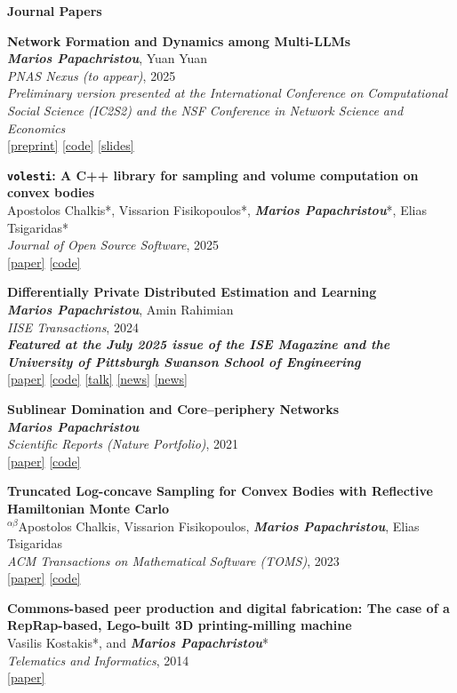 \documentclass[margin]{res}
\newcommand{\field}[2]{\noindent \textbf{#1} \hfill #2 \\}
\newcommand{\alphabeticalorder}[0]{\ensuremath {^{\alpha \beta}}}
\newcommand{\specialurl}[2]{\href {#2} {{{[#1]}}}}
\newcommand{\preprint}[1]{\specialurl {preprint} {#1}}
\newcommand{\code}[1]{\specialurl {code} {#1}}
\newcommand{\talk}[1]{\specialurl {talk} {#1}}
\newcommand{\slides}[1]{\specialurl {slides} {#1}}
\newcommand{\paper}[1]{\specialurl {paper} {#1}}
\newcommand{\authorref}[1]{{\textit{\textbf{#1}}}}
\newcommand{\news}[1]{\specialurl {news} {#1}}
\newcommand{\authorme}{\authorref{Marios Papachristou}}
\newcommand{\bemph}[1]{\textbf{\emph{#1}}}
\newcommand{\publication}[5]{\textbf{#1}\\{#2}\\\emph{#3}, {#4}\\{#5}\smallskip}
\begin{document}
\begin{resume}
\field{Journal Papers}{}{
\begin{enumerate}[nosep, label={[J\arabic*]}]
 		
   \item \publication{Network Formation and Dynamics among Multi-LLMs}{\authorme, Yuan Yuan}{PNAS Nexus (to appear)}{2025}{\emph{Preliminary version presented at the International Conference on Computational Social Science (IC2S2) and the NSF Conference in Network Science and Economics} \\ \preprint{http://arxiv.org/abs/2402.10659} \code{https://github.com/papachristoumarios/llm-network-formation} \slides{https://drive.google.com/file/d/13Qm_82D0WrkmN1LAv2AUmjcputMOdm_y/view?usp=drive_link}} 
      
 
	\item \publication{\texttt{volesti}: A C++ library for sampling and volume computation on convex bodies}{Apostolos Chalkis*, Vissarion Fisikopoulos*, \authorme*, Elias Tsigaridas*}{Journal of Open Source Software}{2025}{\paper{https://joss.theoj.org/papers/10.21105/joss.07886} \code{https://github.com/GeomScale/volesti}}
   \item \publication{Differentially Private Distributed Estimation and Learning}{\authorme, Amin Rahimian}{IISE Transactions}{2024}{\bemph{Featured at the July 2025 issue of the ISE Magazine and the University of Pittsburgh Swanson School of Engineering} \\
   	   	\paper{https://doi.org/10.1080/24725854.2024.2337068} \code{https://github.com/papachristoumarios/dp-distributed-estimation} \talk{https://www.youtube.com/watch?v=Kmm5HEMuS4w} \news{https://news.engineering.pitt.edu/who-sees-who/} \news{https://content.presspage.com/uploads/2602/19858d8c-d2d3-497e-9dcc-3f6eff36c157/ise-junefeature.pdf?10000}}
   \item \publication{Sublinear Domination and Core--periphery Networks}{\authorme}{Scientific Reports (Nature Portfolio)}{2021}{\paper{http://www.nature.com/articles/s41598-021-94105-8} \code{https://bit.ly/3wKNGI0}}
    \item \publication{Truncated Log-concave Sampling for Convex Bodies with Reflective Hamiltonian Monte Carlo}{\alphabeticalorder Apostolos Chalkis, Vissarion Fisikopoulos, \authorme, Elias Tsigaridas}{ACM Transactions on Mathematical Software (TOMS)}{2023}{\paper{https://doi.org/10.1145/3589505} \code{https://github.com/GeomScale/volume_approximation}}
    \item \publication{Commons-based peer production and digital fabrication: The case of a RepRap-based, Lego-built 3D printing-milling machine}{Vasilis Kostakis*, and \authorme*}{Telematics and Informatics}{2014}{\paper{https://bit.ly/2JRoisV}} 
    

\end{enumerate}}
\end{resume}
\end{document}
